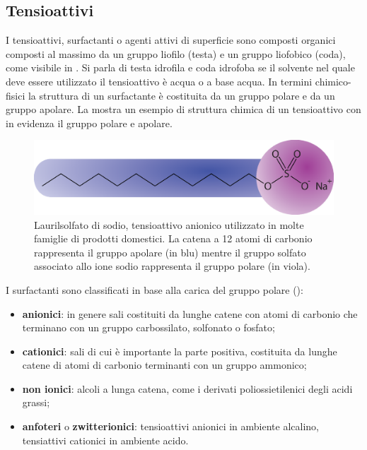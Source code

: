 \subsection{Tensioattivi}
I tensioattivi, surfactanti o agenti attivi di superficie sono composti organici composti al massimo da un gruppo liofilo (testa) e un gruppo liofobico (coda), come visibile in . Si parla di testa idrofila e coda idrofoba se il solvente nel quale deve essere utilizzato il tensioattivo è acqua o a base acqua. In termini chimico-fisici la struttura di un surfactante è costituita da un gruppo polare e da un gruppo apolare. La  mostra un esempio di struttura chimica di un tensioattivo con in evidenza il gruppo polare e apolare.

\begin{figure}[htbp]
    \centering
    \includegraphics[width=.8\textwidth]{fig/foamer/sls.eps}
    \caption{Laurilsolfato di sodio, tensioattivo anionico utilizzato in molte famiglie di prodotti domestici. La catena a 12 atomi di carbonio rappresenta il gruppo apolare (in blu) mentre il gruppo solfato associato allo ione sodio rappresenta il gruppo polare (in viola).}
    \label{fig:sls}
\end{figure}

I surfactanti sono classificati in base alla carica del gruppo polare ():
\begin{itemize}
    \item \textbf{anionici}: in genere sali costituiti da lunghe catene con atomi di carbonio che terminano con un gruppo carbossilato, solfonato o fosfato;
    \item \textbf{cationici}: sali di cui è importante la parte positiva, costituita da lunghe catene di atomi di carbonio terminanti con un gruppo ammonico;
    \item \textbf{non ionici}: alcoli a lunga catena, come i derivati poliossietilenici degli acidi grassi;
    \item \textbf{anfoteri} o \textbf{zwitterionici}: tensioattivi anionici in ambiente alcalino, tensiattivi cationici in ambiente acido.
\end{itemize}

